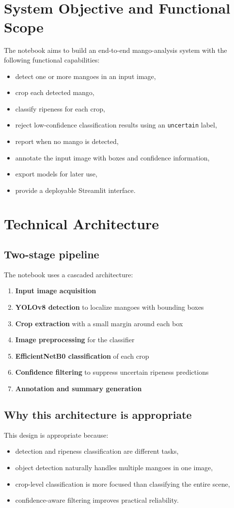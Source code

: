 \documentclass[12pt,a4paper]{article}
\begin{document}
\section{System Objective and Functional Scope}
The notebook aims to build an end-to-end mango-analysis system with the following functional capabilities:
\begin{itemize}
    \item detect one or more mangoes in an input image,
    \item crop each detected mango,
    \item classify ripeness for each crop,
    \item reject low-confidence classification results using an \texttt{uncertain} label,
    \item report when no mango is detected,
    \item annotate the input image with boxes and confidence information,
    \item export models for later use,
    \item provide a deployable Streamlit interface.
\end{itemize}

\section{Technical Architecture}
\subsection{Two-stage pipeline}
The notebook uses a cascaded architecture:
\begin{enumerate}
    \item \textbf{Input image acquisition}
    \item \textbf{YOLOv8 detection} to localize mangoes with bounding boxes
    \item \textbf{Crop extraction} with a small margin around each box
    \item \textbf{Image preprocessing} for the classifier
    \item \textbf{EfficientNetB0 classification} of each crop
    \item \textbf{Confidence filtering} to suppress uncertain ripeness predictions
    \item \textbf{Annotation and summary generation}
\end{enumerate}

\subsection{Why this architecture is appropriate}
This design is appropriate because:
\begin{itemize}
    \item detection and ripeness classification are different tasks,
    \item object detection naturally handles multiple mangoes in one image,
    \item crop-level classification is more focused than classifying the entire scene,
    \item confidence-aware filtering improves practical reliability.
\end{itemize}
\end{document}
